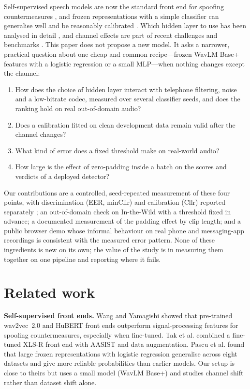 \documentclass[10pt,a4paper]{article}
\begin{document}
Self-supervised speech models are now the standard front end for spoofing countermeasures
\cite{wang2022investigating,tak2022automatic}, and frozen representations with a simple classifier can generalise
well and be reasonably calibrated \cite{pascu2024towards}. Which hidden layer to use has been analysed in detail
\cite{elkheir2025comprehensive}, and channel effects are part of recent challenges and benchmarks
\cite{liu2023asvspoof,wang2026asvspoof5,shi2025benchmarking}. This paper does not propose a new model. It asks a
narrower, practical question about one cheap and common recipe---frozen WavLM Base+ \cite{chen2022wavlm} features with
a logistic regression or a small MLP---when nothing changes except the channel:
\begin{enumerate}
\item How does the choice of hidden layer interact with telephone filtering, noise and a low-bitrate codec, measured
over several classifier seeds, and does the ranking hold on real out-of-domain audio?
\item Does a calibration fitted on clean development data remain valid after the channel changes?
\item What kind of error does a fixed threshold make on real-world audio?
\item How large is the effect of zero-padding inside a batch on the scores and verdicts of a deployed detector?
\end{enumerate}
Our contributions are a controlled, seed-repeated measurement of these four points, with discrimination (EER,
minCllr) and calibration (Cllr) reported separately \cite{brummer2006application}; an out-of-domain check on
In-the-Wild \cite{muller2022does} with a threshold fixed in advance; a documented measurement of the padding effect
by clip length; and a public browser demo whose informal behaviour on real phone and messaging-app recordings is
consistent with the measured error pattern. None of these ingredients is new on its own; the value of the study is in
measuring them together on one pipeline and reporting where it fails.

\section{Related work}
\textbf{Self-supervised front ends.} Wang and Yamagishi \cite{wang2022investigating} showed that pre-trained
wav2vec~2.0 and HuBERT front ends outperform signal-processing features for spoofing countermeasures, especially when
fine-tuned. Tak et al. \cite{tak2022automatic} combined a fine-tuned XLS-R front end with AASIST and data
augmentation. Pascu et al. \cite{pascu2024towards} found that large frozen representations with logistic regression
generalise across eight datasets and give more reliable probabilities than earlier models. Our setup is close to
theirs but uses a small model (WavLM Base+) and studies channel shift rather than dataset shift alone.
\end{document}
